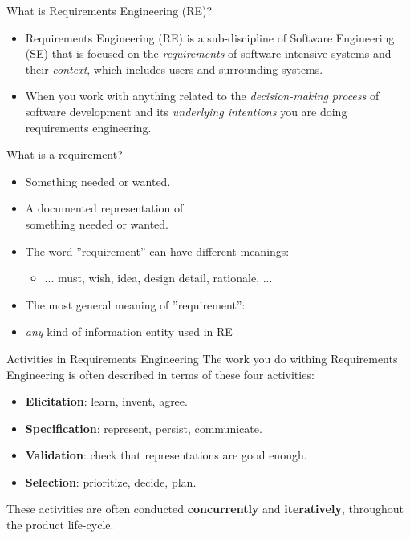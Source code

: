 \documentclass{beamer}
\begin{document}
\begin{frame}[fragile]{What is Requirements Engineering (RE)?}
\begin{itemize}
\item  Requirements Engineering (RE) is a sub-discipline of Software Engineering (SE) that is focused on the \textit{requirements} of software-intensive systems and their \textit{context}, which includes users and surrounding systems.
\item When you work with anything related to the \textit{decision-making process} of software development and its \emph{underlying intentions} you are doing requirements engineering.
\end{itemize}
\end{frame}

\begin{frame}[fragile]{What is a requirement?}
\begin{itemize}
\item Something needed or wanted.
\item A documented representation of \\something needed or wanted.
\item The word ''requirement'' can have different meanings:
\begin{itemize}
\item ... must, wish, idea, design detail, rationale, ...
\end{itemize}
\item The most general meaning of ''requirement'':
\item[] \emph{any} kind of information entity used in RE
\end{itemize}
\end{frame}

\begin{frame}[fragile]{Activities in Requirements Engineering}
The work you do withing Requirements Engineering is often described in terms of these four activities:
\begin{itemize}
\item \textbf{Elicitation}: learn, invent, agree.
\item \textbf{Specification}: represent, persist, communicate.
\item \textbf{Validation}: check that representations are good enough.
\item \textbf{Selection}: prioritize, decide, plan.
\end{itemize}
\vspace*{1em}
These activities are often conducted \textbf{concurrently} and \textbf{iteratively}, throughout the product life-cycle.
\end{frame}
\end{document}
